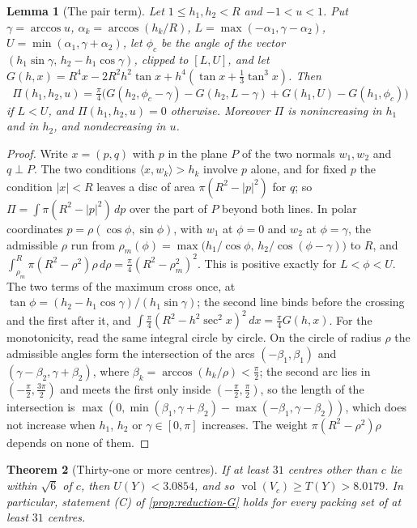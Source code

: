\documentclass[11pt,reqno]{amsart}
\renewcommand{\_}{\origunderscore\allowbreak}
\numberwithin{equation}{section}
\theoremstyle{plain}
\newtheorem{thm}{Theorem}[section]
\newtheorem{lem}[thm]{Lemma}
\theoremstyle{definition}
\theoremstyle{remark}
\DeclareMathOperator{\vol}{vol}
\begin{document}
\begin{lem}[The pair term]\label{lem:pair-closed}
Let $1\le h_1,h_2<R$ and $-1<u<1$. Put $\gamma=\arccos u$,
$\alpha_k=\arccos(h_k/R)$, $L=\max(-\alpha_1,\gamma-\alpha_2)$,
$U=\min(\alpha_1,\gamma+\alpha_2)$, let $\phi_c$ be the angle of the vector
$(h_1\sin\gamma,\,h_2-h_1\cos\gamma)$, clipped to $[L,U]$, and let
$G(h,x)=R^4x-2R^2h^2\tan x+h^4(\tan x+\frac13\tan^3x)$. Then
\[
  \Pi(h_1,h_2,u)=\tfrac\pi4\bigl(G(h_2,\phi_c-\gamma)-G(h_2,L-\gamma)
  +G(h_1,U)-G(h_1,\phi_c)\bigr)
\]
if $L<U$, and $\Pi(h_1,h_2,u)=0$ otherwise. Moreover $\Pi$ is nonincreasing
in $h_1$ and in $h_2$, and nondecreasing in $u$.
\end{lem}

\begin{proof}
Write $x=(p,q)$ with $p$ in the plane $P$ of the two normals $w_1,w_2$ and
$q\perp P$. The two conditions $\langle x,w_k\rangle>h_k$ involve $p$ alone,
and for fixed $p$ the condition $|x|<R$ leaves a disc of area
$\pi(R^2-|p|^2)$ for $q$; so $\Pi=\int\pi(R^2-|p|^2)\,dp$ over the part of
$P$ beyond both lines. In polar coordinates $p=\rho(\cos\phi,\sin\phi)$,
with $w_1$ at $\phi=0$ and $w_2$ at $\phi=\gamma$, the admissible $\rho$ run
from $\rho_m(\phi)=\max\bigl(h_1/\cos\phi,\,h_2/\cos(\phi-\gamma)\bigr)$ to
$R$, and $\int_{\rho_m}^R\pi(R^2-\rho^2)\rho\,d\rho=\frac\pi4(R^2-\rho_m^2)^2$.
This is positive exactly for $L<\phi<U$. The two terms of the maximum cross
once, at $\tan\phi=(h_2-h_1\cos\gamma)/(h_1\sin\gamma)$; the second line
binds before the crossing and the first after it, and
$\int\frac\pi4(R^2-h^2\sec^2x)^2\,dx=\frac\pi4G(h,x)$. For the monotonicity,
read the same integral circle by circle. On the circle of radius $\rho$ the
admissible angles form the intersection of the arcs
$(-\beta_1,\beta_1)$ and $(\gamma-\beta_2,\gamma+\beta_2)$, where
$\beta_k=\arccos(h_k/\rho)<\frac\pi2$; the second arc lies in
$(-\frac\pi2,\frac{3\pi}2)$ and meets the first only inside
$(-\frac\pi2,\frac\pi2)$, so the length of the intersection is
$\max(0,\min(\beta_1,\gamma+\beta_2)-\max(-\beta_1,\gamma-\beta_2))$, which
does not increase when $h_1$, $h_2$ or $\gamma\in[0,\pi]$ increases. The
weight $\pi(R^2-\rho^2)\rho$ depends on none of them.
\end{proof}

\begin{thm}[Thirty-one or more centres]\label{thm:count31}
If at least $31$ centres other than $c$ lie within $\sqrt6$ of $c$, then
$U(Y)<3.0854$, and so $\vol(V_c)\ge T(Y)>8.0179$. In particular, statement
(C) of \cref{prop:reduction-G} holds for every packing set of at least $31$
centres.
\end{thm}
\end{document}
